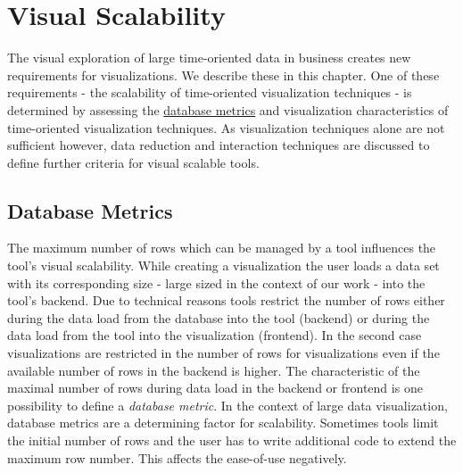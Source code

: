 \chapter{Visual Scalability }
\label{chap:scalability}
The visual exploration of large time-oriented data in business creates new requirements for visualizations. We describe these in this chapter. One of these requirements - the scalability of time-oriented visualization techniques - is determined by assessing the \hyperref[databasemetrics]{database metrics} and visualization characteristics of time-oriented visualization techniques. As visualization techniques alone are not sufficient however, data reduction and interaction techniques are discussed to define further criteria for visual scalable tools.

\section{Database Metrics} \label{databsemetrics}
The maximum number of rows which can be managed by a tool influences the tool's visual scalability. While creating a visualization the user loads a data set with its corresponding size - large sized in the context of our work - into the tool's backend. Due to technical reasons tools restrict the number of rows either during the data load from the database into the tool (backend) or during the data load from the tool into the visualization (frontend). In the second case visualizations are restricted in the number of rows for visualizations even if the available number of rows in the backend is higher. The characteristic of the maximal number of rows during data load in the backend or frontend is one possibility to define a \textit{database metric}. In the context of large data visualization, database metrics are a determining factor for scalability. Sometimes tools limit the initial number of rows and the user has to write additional code to extend the maximum row number. This affects the ease-of-use negatively.

